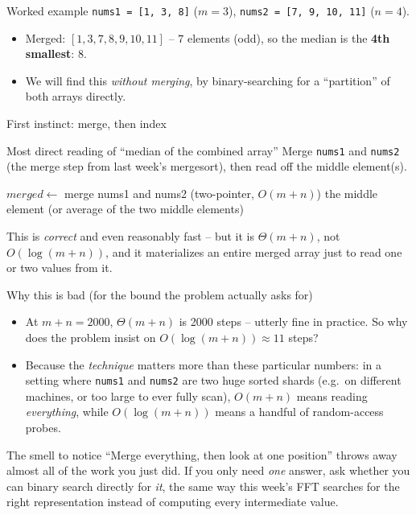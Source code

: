\documentclass[11pt,aspectratio=169]{beamer}
\begin{document}
\begin{frame}{Worked example}
  \texttt{nums1 = [1, 3, 8]} ($m=3$), \texttt{nums2 = [7, 9, 10, 11]} ($n=4$).
  \begin{itemize}
    \item Merged: $[1,3,7,8,9,10,11]$ -- $7$ elements (odd), so the median is the
    \textbf{4th smallest}: $8$.
    \item We will find this \emph{without merging}, by binary-searching for a
    ``partition'' of both arrays directly.
  \end{itemize}
\end{frame}

\begin{frame}{First instinct: merge, then index}
  \begin{block}{Most direct reading of ``median of the combined array''}
    Merge \texttt{nums1} and \texttt{nums2} (the merge step from last week's mergesort),
    then read off the middle element(s).
  \end{block}
  \begin{algorithmic}[1]
      \State $merged \gets$ merge nums1 and nums2 (two-pointer, $O(m+n)$)
      \State \Return the middle element (or average of the two middle elements)
    \EndFunction
  \end{algorithmic}
  This is \emph{correct} and even reasonably fast -- but it is $\Theta(m+n)$, not
  $O(\log(m+n))$, and it materializes an entire merged array just to read one or two
  values from it.
\end{frame}

\begin{frame}{Why this is bad (for the bound the problem actually asks for)}
  \begin{itemize}
    \item At $m+n=2000$, $\Theta(m+n)$ is 2000 steps -- utterly fine in practice. So why
    does the problem insist on $O(\log(m+n)) \approx 11$ steps?
    \item Because the \emph{technique} matters more than these particular numbers: in a
    setting where \texttt{nums1} and \texttt{nums2} are two huge sorted shards (e.g.\
    on different machines, or too large to ever fully scan), $O(m+n)$ means reading
    \emph{everything}, while $O(\log(m+n))$ means a handful of random-access probes.
  \end{itemize}
  \begin{alertblock}{The smell to notice}
    ``Merge everything, then look at one position'' throws away almost all of the
    work you just did. If you only need \emph{one} answer, ask whether you can binary
    search directly for \emph{it}, the same way this week's FFT searches for the right
    representation instead of computing every intermediate value.
  \end{alertblock}
\end{frame}
\end{document}
